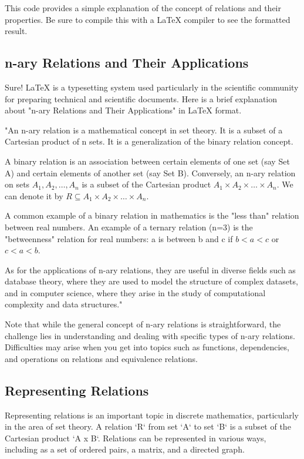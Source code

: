 This code provides a simple explanation of the concept of relations and their properties. Be sure to compile this with a LaTeX compiler to see the formatted result.

\subsection{n-ary Relations and Their Applications}
Sure! {\LaTeX} is a typesetting system used particularly in the scientific community for preparing technical and scientific documents. Here is a brief explanation about "n-ary Relations and Their Applications" in LaTeX format.

"An n-ary relation is a mathematical concept in set theory. It is a subset of a Cartesian product of n sets. It is a generalization of the binary relation concept. 

A binary relation is an association between certain elements of one set (say Set A) and certain elements of another set (say Set B). Conversely, an n-ary relation on sets $A_1, A_2, \ldots, A_n$ is a subset of the Cartesian product $A_1 \times A_2 \times \ldots \times A_n$. We can denote it by $R \subseteq A_1 \times A_2 \times \ldots \times A_n$.

A common example of a binary relation in mathematics is the "less than" relation between real numbers. An example of a ternary relation (n=3) is the "betweenness" relation for real numbers: a is between b and c if $b < a < c$ or $c < a < b$.

As for the applications of n-ary relations, they are useful in diverse fields such as database theory, where they are used to model the structure of complex datasets, and in computer science, where they arise in the study of computational complexity and data structures."
 
Note that while the general concept of n-ary relations is straightforward, the challenge lies in understanding and dealing with specific types of n-ary relations. Difficulties may arise when you get into topics such as functions, dependencies, and operations on relations and equivalence relations.

\subsection{Representing Relations}
Representing relations is an important topic in discrete mathematics, particularly in the area of set theory. A relation `R` from set `A` to set `B` is a subset of the Cartesian product `A x B`. Relations can be represented in various ways, including as a set of ordered pairs, a matrix, and a directed graph.

